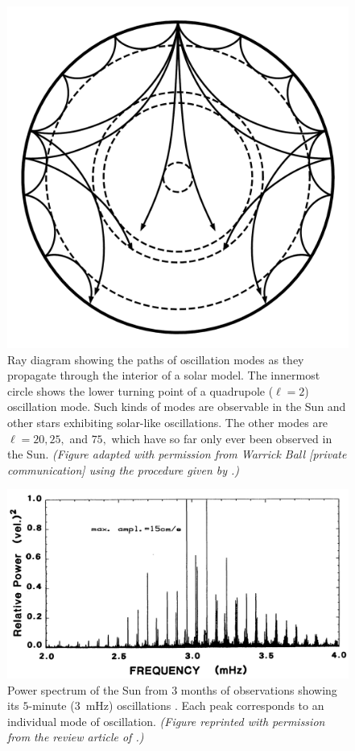 \begin{figure}[t!]%
    \centering
    \vspace*{-0.35cm}
    \includegraphics[width=0.73\textwidth%
        ]{figs/pulse/modelS_rays.pdf}
    \caption[Ray path diagram for solar oscillation modes]{Ray diagram showing the paths of oscillation modes as they propagate through the interior of a solar model. 
    The innermost circle shows the lower turning point of a quadrupole (${\ell=2}$) oscillation mode. 
    Such kinds of modes are observable in the Sun and other stars exhibiting solar-like oscillations. 
    The other modes are ${\ell=20}, 25,$ and $75,$ which have so far only ever been observed in the Sun. 
    \emph{(Figure adapted with permission from Warrick Ball [private communication] using the procedure given by \citealt{2000PhDT.........9G}.)}
    \label{fig:rays}}
\end{figure}


\begin{figure}
    \centering
    \includegraphics[width=\textwidth]{pics/solar-power-spectrum.png}
    \caption[Historical solar power spectrum]{Power spectrum of the Sun from $3$ months of observations showing its $5$-minute ($3$~mHz) oscillations \citep{1981SoPh...74...51C}. 
    Each peak corresponds to an individual mode of oscillation. 
    \emph{(Figure reprinted with permission from the review article of \citealt{1984ARA&A..22..593D}.)}
    \label{fig:solar-power-spectrum}}
\end{figure}


